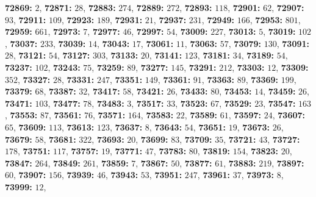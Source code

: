 \textsf{\bfseries 72869:} $2$, \textsf{\bfseries 72871:} $28$, \textsf{\bfseries 72883:} $274$, \textsf{\bfseries 72889:} $272$, \textsf{\bfseries 72893:} $118$, \textsf{\bfseries 72901:} $62$, \textsf{\bfseries 72907:} $93$, \textsf{\bfseries 72911:} $109$, \textsf{\bfseries 72923:} $189$, \textsf{\bfseries 72931:} $21$, \textsf{\bfseries 72937:} $231$, \textsf{\bfseries 72949:} $166$, \textsf{\bfseries 72953:} $801$, \textsf{\bfseries 72959:} $661$, \textsf{\bfseries 72973:} $7$, \textsf{\bfseries 72977:} $46$, \textsf{\bfseries 72997:} $54$, \textsf{\bfseries 73009:} $227$, \textsf{\bfseries 73013:} $5$, \textsf{\bfseries 73019:} $102$, \textsf{\bfseries 73037:} $233$, \textsf{\bfseries 73039:} $14$, \textsf{\bfseries 73043:} $17$, \textsf{\bfseries 73061:} $11$, \textsf{\bfseries 73063:} $57$, \textsf{\bfseries 73079:} $130$, \textsf{\bfseries 73091:} $28$, \textsf{\bfseries 73121:} $54$, \textsf{\bfseries 73127:} $303$, \textsf{\bfseries 73133:} $20$, \textsf{\bfseries 73141:} $123$, \textsf{\bfseries 73181:} $34$, \textsf{\bfseries 73189:} $54$, \textsf{\bfseries 73237:} $102$, \textsf{\bfseries 73243:} $75$, \textsf{\bfseries 73259:} $89$, \textsf{\bfseries 73277:} $145$, \textsf{\bfseries 73291:} $212$, \textsf{\bfseries 73303:} $12$, \textsf{\bfseries 73309:} $352$, \textsf{\bfseries 73327:} $28$, \textsf{\bfseries 73331:} $247$, \textsf{\bfseries 73351:} $149$, \textsf{\bfseries 73361:} $91$, \textsf{\bfseries 73363:} $89$, \textsf{\bfseries 73369:} $199$, \textsf{\bfseries 73379:} $68$, \textsf{\bfseries 73387:} $32$, \textsf{\bfseries 73417:} $58$, \textsf{\bfseries 73421:} $26$, \textsf{\bfseries 73433:} $80$, \textsf{\bfseries 73453:} $14$, \textsf{\bfseries 73459:} $26$, \textsf{\bfseries 73471:} $103$, \textsf{\bfseries 73477:} $78$, \textsf{\bfseries 73483:} $3$, \textsf{\bfseries 73517:} $33$, \textsf{\bfseries 73523:} $67$, \textsf{\bfseries 73529:} $23$, \textsf{\bfseries 73547:} $163$, \textsf{\bfseries 73553:} $87$, \textsf{\bfseries 73561:} $76$, \textsf{\bfseries 73571:} $164$, \textsf{\bfseries 73583:} $22$, \textsf{\bfseries 73589:} $61$, \textsf{\bfseries 73597:} $24$, \textsf{\bfseries 73607:} $65$, \textsf{\bfseries 73609:} $113$, \textsf{\bfseries 73613:} $123$, \textsf{\bfseries 73637:} $8$, \textsf{\bfseries 73643:} $54$, \textsf{\bfseries 73651:} $19$, \textsf{\bfseries 73673:} $26$, \textsf{\bfseries 73679:} $58$, \textsf{\bfseries 73681:} $322$, \textsf{\bfseries 73693:} $20$, \textsf{\bfseries 73699:} $83$, \textsf{\bfseries 73709:} $35$, \textsf{\bfseries 73721:} $43$, \textsf{\bfseries 73727:} $178$, \textsf{\bfseries 73751:} $117$, \textsf{\bfseries 73757:} $19$, \textsf{\bfseries 73771:} $47$, \textsf{\bfseries 73783:} $80$, \textsf{\bfseries 73819:} $154$, \textsf{\bfseries 73823:} $20$, \textsf{\bfseries 73847:} $264$, \textsf{\bfseries 73849:} $261$, \textsf{\bfseries 73859:} $7$, \textsf{\bfseries 73867:} $50$, \textsf{\bfseries 73877:} $61$, \textsf{\bfseries 73883:} $219$, \textsf{\bfseries 73897:} $60$, \textsf{\bfseries 73907:} $156$, \textsf{\bfseries 73939:} $46$, \textsf{\bfseries 73943:} $53$, \textsf{\bfseries 73951:} $247$, \textsf{\bfseries 73961:} $37$, \textsf{\bfseries 73973:} $8$, \textsf{\bfseries 73999:} $12$, 
